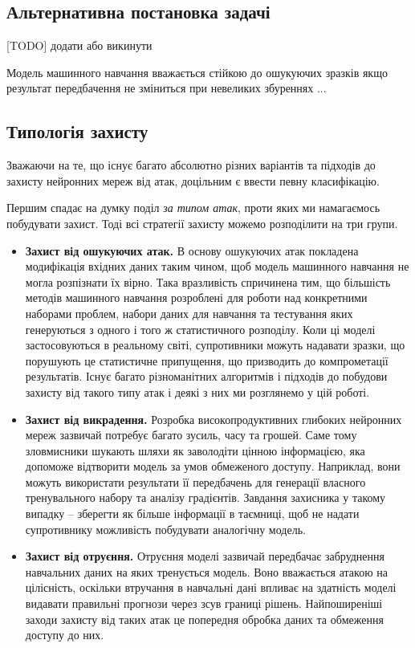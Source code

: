 \documentclass[14pt,a4paper]{extarticle}
\newcounter{e}
\numberwithin{equation}{section}
\numberwithin{figure}{section}
\begin{document}
 \subsection{Альтернативна постановка задачі}
 
 [TODO] додати або викинути
 
 Модель машинного навчання вважається стійкою до ошукуючих зразків якщо результат передбачення не зміниться при невеликих збуреннях ...
 
 
 
 \subsection{Типологія захисту}
 Зважаючи на те, що існує багато абсолютно різних варіантів та підходів до захисту нейронних мереж від атак, доцільним є ввести певну класифікацію.
 
 Першим спадає на думку поділ \textit{за типом атак}, проти яких ми намагаємось побудувати захист. Тоді всі стратегії захисту можемо розподілити на три групи. 
 
 \begin{itemize}
 	\item \textbf{Захист від ошукуючих атак.} 
 	В основу ошукуючих атак покладена модифікація вхідних даних таким чином, щоб модель машинного навчання не могла розпізнати їх вірно. Така вразливість спричинена тим, що більшість методів машинного навчання розроблені для роботи над конкретними наборами проблем, набори даних для навчання та тестування яких генеруються з одного і того ж статистичного розподілу. Коли ці моделі застосовуються в реальному світі, супротивники можуть надавати зразки, що порушують це статистичне припущення, що призводить до компрометації результатів. Існує багато різноманітних алгоритмів і підходів до побудови захисту від такого типу атак і деякі з них ми розглянемо у цій роботі.
 	
 	\item \textbf{Захист від викрадення.}
 	Розробка високопродуктивних глибоких нейронних мереж зазвичай потребує багато зусиль, часу та грошей. Саме тому зловмисники шукають шляхи як заволодіти цінною інформацією, яка допоможе відтворити модель за умов обмеженого доступу. Наприклад, вони можуть використати результати її передбачень для генерації власного тренувального набору та аналізу градієнтів. Завдання захисника у такому випадку -- зберегти як більше інформації в таємниці, щоб не надати супротивнику можливість побудувати аналогічну модель.
 	
 	\item \textbf{Захист від отруєння.}
 	Отруєння моделі зазвичай передбачає забруднення навчальних даних на яких тренується модель. Воно вважається атакою на цілісність, оскільки втручання в навчальні дані впливає на здатність моделі видавати правильні прогнози через зсув границі рішень. Найпоширеніші заходи захисту від таких атак це попередня обробка даних та обмеження доступу до них.
 \end{itemize}
 
\end{document}
